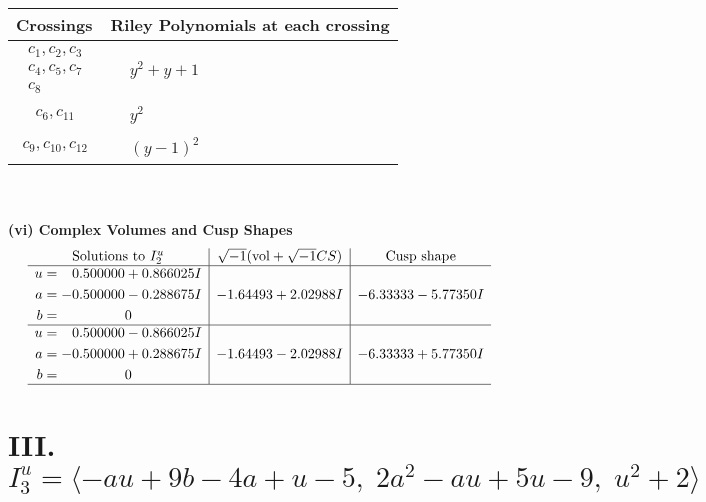 \documentclass[1p]{elsarticle_modified}
\theoremstyle{definition}
\newcommand{\I}{\sqrt{-1}}
\begin{document}
\begin{tabular}{m{50pt}|m{274pt}}
Crossings & \hspace{64pt}Riley Polynomials at each crossing \\
\hline $$\begin{aligned}c_{1},c_{2},c_{3}\\c_{4},c_{5},c_{7}\\c_{8}\end{aligned}$$&$\begin{aligned}
&y^2+y+1
\end{aligned}$\\
\hline $$\begin{aligned}c_{6},c_{11}\end{aligned}$$&$\begin{aligned}
&y^2
\end{aligned}$\\
\hline $$\begin{aligned}c_{9},c_{10},c_{12}\end{aligned}$$&$\begin{aligned}
&(y-1)^2
\end{aligned}$\\
\hline
\end{tabular}\\~\\
\newpage\flushleft \textbf{(vi) Complex Volumes and Cusp Shapes}
$$\begin{array}{c|c|c}  
\text{Solutions to }I^u_{2}& \I (\text{vol} + \sqrt{-1}CS) & \text{Cusp shape}\\
 \hline 
\begin{aligned}
u &= \phantom{-}0.500000 + 0.866025 I \\
a &= -0.500000 - 0.288675 I \\
b &= \phantom{-0.000000 } 0\end{aligned}
 & -1.64493 + 2.02988 I & -6.33333 - 5.77350 I \\ \hline\begin{aligned}
u &= \phantom{-}0.500000 - 0.866025 I \\
a &= -0.500000 + 0.288675 I \\
b &= \phantom{-0.000000 } 0\end{aligned}
 & -1.64493 - 2.02988 I & -6.33333 + 5.77350 I\\
 \hline 
 \end{array}$$\newpage\newpage\renewcommand{\arraystretch}{1}
\centering \section*{III. $I^u_{3}= \langle - a u+9 b-4 a+u-5,\;2 a^2- a u+5 u-9,\;u^2+2 \rangle$}
\end{document}
